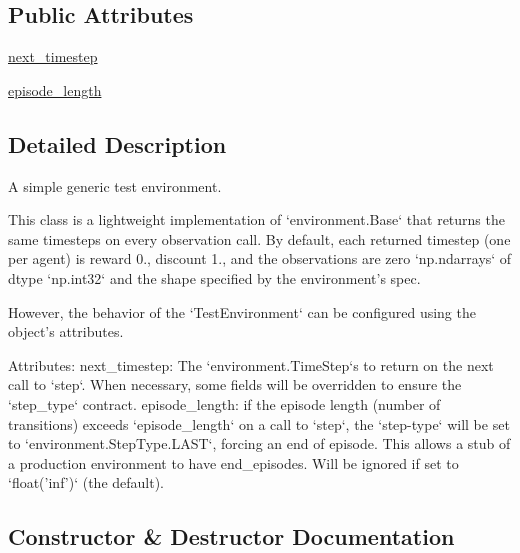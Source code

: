 \subsection*{Public Attributes}
\begin{DoxyCompactItemize}
\item 
\mbox{\hyperlink{classpysc2_1_1env_1_1mock__sc2__env_1_1___test_environment_ae8d2e3dc5088a409252d626f2d35203d}{next\+\_\+timestep}}
\item 
\mbox{\hyperlink{classpysc2_1_1env_1_1mock__sc2__env_1_1___test_environment_a2c0bd6e676d1490b3b528831ca501534}{episode\+\_\+length}}
\end{DoxyCompactItemize}


\subsection{Detailed Description}
\begin{DoxyVerb}A simple generic test environment.

This class is a lightweight implementation of `environment.Base` that returns
the same timesteps on every observation call. By default, each returned
timestep (one per agent) is reward 0., discount 1., and the observations are
zero `np.ndarrays` of dtype `np.int32` and the shape specified by the
environment's spec.

However, the behavior of the `TestEnvironment` can be configured using the
object's attributes.

Attributes:
  next_timestep: The `environment.TimeStep`s to return on the next call to
    `step`. When necessary, some fields will be overridden to ensure the
    `step_type` contract.
  episode_length: if the episode length (number of transitions) exceeds
    `episode_length` on a call to `step`, the `step-type` will be set to
    `environment.StepType.LAST`, forcing an end of episode. This allows a
    stub of a production environment to have end_episodes. Will be ignored if
    set to `float('inf')` (the default).
\end{DoxyVerb}
 

\subsection{Constructor \& Destructor Documentation}
\mbox{\label{classpysc2_1_1env_1_1mock__sc2__env_1_1___test_environment_ad3acb8d357a313a916e134895503f4bd}} 
